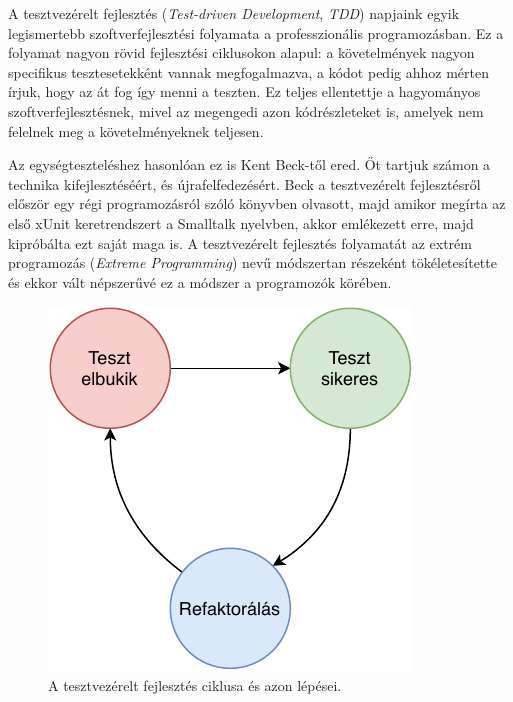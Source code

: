 
A tesztvezérelt fejlesztés (\emph{Test-driven Development}, \emph{TDD}) napjaink egyik legismertebb szoftverfejlesztési folyamata a professzionális programozásban. Ez a folyamat nagyon rövid fejlesztési ciklusokon alapul: a követelmények nagyon specifikus tesztesetekként vannak megfogalmazva, a kódot pedig ahhoz mérten írjuk, hogy az át fog így menni a teszten. Ez teljes ellentettje a hagyományos szoftverfejlesztésnek, mivel az megengedi azon kódrészleteket is, amelyek nem felelnek meg a követelményeknek teljesen.

Az egységteszteléshez hasonlóan ez is Kent Beck-től ered. Őt tartjuk számon a technika kifejlesztéséért, és újrafelfedezésért. Beck a tesztvezérelt fejlesztésről először egy régi programozásról szóló könyvben olvasott, majd amikor megírta az első xUnit keretrendszert a Smalltalk nyelvben, akkor emlékezett erre, majd kipróbálta ezt saját maga is. \cite{beck_2012_tdd-rediscovery} A tesztvezérelt fejlesztés folyamatát az extrém programozás (\emph{Extreme Programming}) nevű módszertan részeként tökéletesítette és ekkor vált népszerűvé ez a módszer a programozók körében.

\begin{figure}[h]
    \centering
    \includegraphics{images/tdd_steps.pdf}
    \caption{A tesztvezérelt fejlesztés ciklusa és azon lépései.}
    \label{fig:tdd_steps}
\end{figure}

